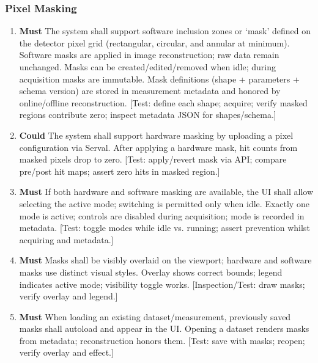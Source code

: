 \documentclass[10pt]{article}
\newcommand{\PriorityTag}[2]{%
  \colorbox{#2!25}{\footnotesize\textsf{\textbf{#1}}}\hspace{0.6em}}
\newcommand{\must}{\leavevmode\PriorityTag{Must}{green}}
\newcommand{\could}{\leavevmode\PriorityTag{Could}{cyan}}
\newcounter{reqgrp}[section] %
\newcounter{reqno}
\newcommand{\reqprefix}{GEN}
\newenvironment{requirements}[1]{%
  \renewcommand{\reqprefix}{#1}%
  \refstepcounter{reqgrp}%
  \setcounter{reqno}{0}%
  \begin{enumerate}[leftmargin=*]
}{\end{enumerate}}
\begin{document}
\subsubsection{Pixel Masking}
\begin{requirements}{PMK}

\item \must {}
  {The system shall support software inclusion zones or `mask' defined on the detector pixel grid (rectangular, circular, and annular at minimum). Software masks are applied in image reconstruction; raw data remain unchanged.}
  {Masks can be created/edited/removed when idle; during acquisition masks are immutable. Mask definitions (shape + parameters + schema version) are stored in measurement metadata and honored by online/offline reconstruction.}
  [Test: define each shape; acquire; verify masked regions contribute zero; inspect metadata JSON for shapes/schema.]

\item \could {}
  {The system shall support hardware masking by uploading a pixel configuration via Serval. }
  {After applying a hardware mask, hit counts from masked pixels drop to zero.}
  [Test: apply/revert mask via API; compare pre/post hit maps; assert zero hits in masked region.]

\item \must {}
  {If both hardware and software masking are available, the UI shall allow selecting the active mode; switching is permitted only when idle.}
  {Exactly one mode is active; controls are disabled during acquisition; mode is recorded in metadata.}
  [Test: toggle modes while idle vs. running; assert prevention whilst acquiring and metadata.]

\item \must {}
  {Masks shall be visibly overlaid on the viewport; hardware and software masks use distinct visual styles.}
  {Overlay shows correct bounds; legend indicates active mode; visibility toggle works.}
  [Inspection/Test: draw masks; verify overlay and legend.]

\item \must {}
  {When loading an existing dataset/measurement, previously saved masks shall autoload and appear in the UI.}
  {Opening a dataset renders masks from metadata; reconstruction honors them.}
  [Test: save with masks; reopen; verify overlay and effect.]

\end{requirements}
\end{document}
